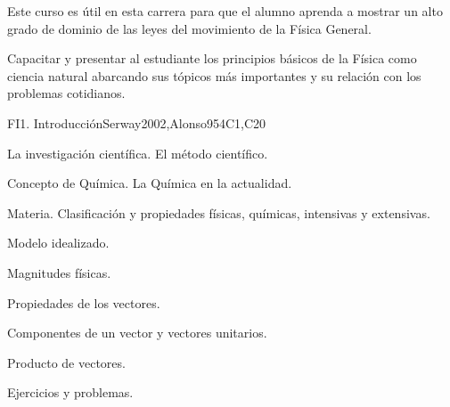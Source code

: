 \begin{syllabus}


\begin{justification}

Este curso es útil en esta carrera para que el alumno aprenda a mostrar un alto grado de dominio de las leyes del movimiento de la Física General.

\end{justification}

\begin{goals}
\item Capacitar y presentar al estudiante los principios básicos de la Física como ciencia natural abarcando sus tópicos más importantes y su relación con los problemas cotidianos.
\end{goals}

\begin{outcomes}
  \item {}
  \item {}
  \item {}
\end{outcomes}

\begin{competences}
    \item {}
    \item {}
\end{competences}

\begin{unit}{FI1. Introducción}{}{Serway2002,Alonso95}{4}{C1,C20}
\begin{topics}
      \item La investigación científica. El método científico.
      \item Concepto de Química. La Química en la actualidad.
      \item Materia. Clasificación y propiedades físicas, químicas, intensivas y extensivas.
      \item Modelo idealizado.
      \item Magnitudes físicas.
      \item Propiedades de los vectores.
      \item Componentes de un vector y vectores unitarios.
      \item Producto de vectores.
      \item Ejercicios y problemas.
   \end{topics}


\end{unit}
\end{syllabus}
